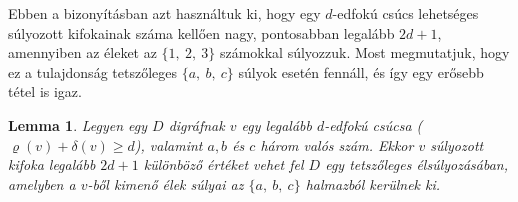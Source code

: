 \documentclass[12pt, a4paper]{report}
\newtheorem{lem}[tét]{Lemma}
\theoremstyle{remark}
\theoremstyle{definition}
\begin{document}
Ebben a bizonyításban azt használtuk ki, hogy egy $d$-edfokú csúcs lehetséges súlyozott kifokainak száma kellően nagy, pontosabban legalább $2d + 1$, amennyiben az éleket az $\lbrace 1,\ 2,\ 3 \rbrace$ számokkal súlyozzuk. Most megmutatjuk, hogy ez a tulajdonság tetszőleges $\lbrace a,\ b,\ c \rbrace$ súlyok esetén fennáll, és így egy erősebb tétel is igaz.

\begin{lem}
Legyen egy $D$ digráfnak $v$ egy legalább $d$-edfokú csúcsa ($\varrho(v) + \delta(v) \geq d$), valamint $a, b$ és $c$ három valós szám. Ekkor $v$ súlyozott kifoka legalább $2d + 1$ különböző értéket vehet fel $D$ egy tetszőleges élsúlyozásában, amelyben a $v$-ből kimenő élek súlyai az $\lbrace a,\ b,\ c \rbrace$ halmazból kerülnek ki.
\end{lem}
\end{document}
